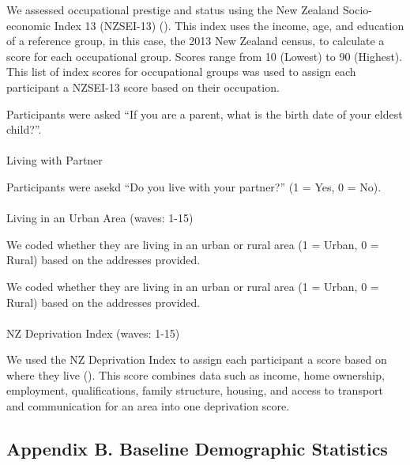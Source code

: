 \documentclass[
  singlecolumn]{article}
\makeatletter
\let\oldparagraph\paragraph
\renewcommand{\paragraph}{
    \@ifstar
      \xxxParagraphStar
      \xxxParagraphNoStar
  }
\newcommand{\xxxParagraphStar}[1]{\oldparagraph*{#1}\mbox{}}
\newcommand{\xxxParagraphNoStar}[1]{\oldparagraph{#1}\mbox{}}
\makeatother
\begin{document}
We assessed occupational prestige and status using the New Zealand
Socio-economic Index 13 (NZSEI-13) (). This index uses the income, age, and education of
a reference group, in this case, the 2013 New Zealand census, to
calculate a score for each occupational group. Scores range from 10
(Lowest) to 90 (Highest). This list of index scores for occupational
groups was used to assign each participant a NZSEI-13 score based on
their occupation.

Participants were asked ``If you are a parent, what is the birth date of
your eldest child?''.

\paragraph{Living with Partner}\label{living-with-partner}

Participants were asekd ``Do you live with your partner?'' (1 = Yes, 0 =
No).

\paragraph{Living in an Urban Area (waves:
1-15)}\label{living-in-an-urban-area-waves-1-15}

We coded whether they are living in an urban or rural area (1 = Urban, 0
= Rural) based on the addresses provided.

We coded whether they are living in an urban or rural area (1 = Urban, 0
= Rural) based on the addresses provided.

\paragraph{NZ Deprivation Index (waves:
1-15)}\label{nz-deprivation-index-waves-1-15}

We used the NZ Deprivation Index to assign each participant a score
based on where they live (). This score combines data such as income, home ownership,
employment, qualifications, family structure, housing, and access to
transport and communication for an area into one deprivation score.

\subsection{Appendix B. Baseline Demographic
Statistics}\label{appendix-demographics}
\end{document}
